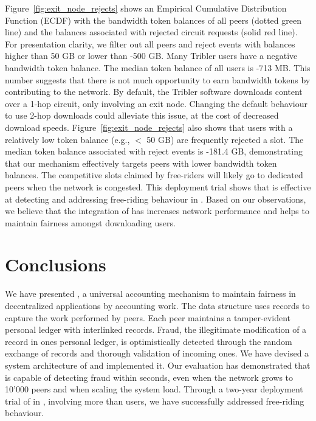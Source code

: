 Figure~\ref{fig:exit_node_rejects} shows an Empirical Cumulative Distribution Function (ECDF) with the bandwidth token balances of all peers (dotted green line) and the balances associated with rejected circuit requests (solid red line).
For presentation clarity, we filter out all peers and reject events with balances higher than 50 GB or lower than -500 GB.
Many Tribler users have a negative bandwidth token balance.
The median token balance of all users is -713 MB.
This number suggests that there is not much opportunity to earn bandwidth tokens by contributing to the network.
By default, the Tribler software downloads content over a 1-hop circuit, only involving an exit node.
Changing the default behaviour to use 2-hop downloads could alleviate this issue, at the cost of decreased download speeds.
Figure~\ref{fig:exit_node_rejects} also shows that users with a relatively low token balance (e.g., $ < $ 50 GB) are frequently rejected a slot.
The median token balance associated with reject events is -181.4 GB, demonstrating that our mechanism effectively targets peers with lower bandwidth token balances.
The competitive slots claimed by free-riders will likely go to dedicated peers when the network is congested.
This deployment trial shows that \TrustChain{} is effective at detecting and addressing free-riding behaviour in \Tribler{}.
Based on our observations, we believe that the integration of \TrustChain{} has increases network performance and helps to maintain fairness amongst downloading users.



\section{Conclusions}
We have presented \TrustChain{}, a universal accounting mechanism to maintain fairness in decentralized applications by accounting work.
The \TrustChain{} data structure uses records to capture the work performed by peers.
Each peer maintains a tamper-evident personal ledger with interlinked records.
Fraud, the illegitimate modification of a record in ones personal ledger, is optimistically detected through the random exchange of records and thorough validation of incoming ones.
We have devised a system architecture of \TrustChain{} and implemented it.
Our evaluation has demonstrated that \TrustChain{} is capable of detecting fraud within seconds, even when the network grows to 10'000 peers and when scaling the system load.
Through a two-year deployment trial of \TrustChain{} in \Tribler{}, involving more than \TrialUsers{} users, we have successfully addressed free-riding behaviour.

